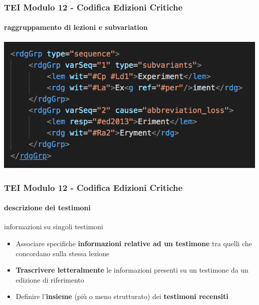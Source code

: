 \begin{frame}
    \frametitle{TEI Modulo 12 - Codifica Edizioni Critiche}
    \framesubtitle{raggruppamento di lezioni e subvariation}
    \addtocounter{nframe}{1}
    

    \begin{center}
        \includegraphics[width=.95\textwidth]{imgs/rdgGrp-seq.png}
    \end{center}


\end{frame}



\begin{frame}
    \frametitle{TEI Modulo 12 - Codifica Edizioni Critiche}
    \framesubtitle{descrizione dei testimoni}
    \addtocounter{nframe}{1}

    \begin{block}{informazioni su singoli testimoni}
      \begin{itemize}
          \item Associare specifiche \textbf{informazioni relative ad un testimone} tra quelli che concordano sulla stessa lezione
          \item \textbf{Trascrivere letteralmente} le informazioni presenti su un testimone da un edizione di riferimento
          \item Definire l'\textbf{insieme} (più o meno strutturato) dei \textbf{testimoni recensiti}
      \end{itemize}
    \end{block}

\end{frame}



